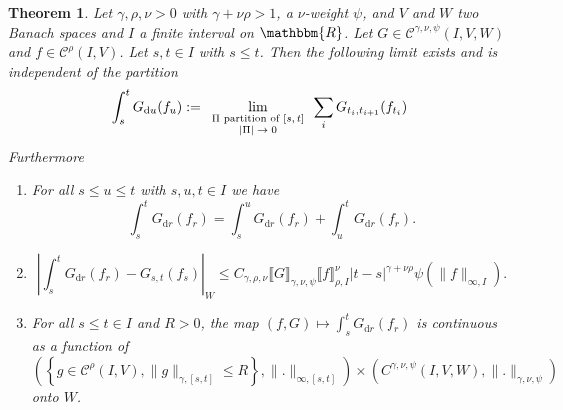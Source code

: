 \documentclass[a4paper,11pt]{article}
\newcommand{\assign}{:=}
\newcommand{\mathd}{\mathrm{d}}
\newcommand{\tmscript}[1]{\text{\scriptsize{$#1$}}}
\newtheorem{theorem}{Theorem}[section]
\newcommand{\CC}{\mathscr C}
\begin{document}
\begin{theorem}
  \label{theorem:young integral}Let $\gamma , \rho , \nu >0$ with $\gamma +
  \nu \rho >1$, a $\nu$-weight $\psi$, and $V$ and $W$ two Banach spaces and
  $I$ a finite interval on $\mathbbm{R}$. Let $G \in \CC^{\gamma , \nu , \psi}
  ( I,V,W )$ and $f \in \CC^{\rho} (I,V)$. Let $s,t \in I$ with $s \leqslant
  t$. Then the following limit exists and is independent of the partition
  \[ \int_{s}^{t} G_{\mathd u} (f_{u} ) \assign
     \lim_{\tmscript{\begin{array}{c}
         \text{$\Pi$ partition of $[s,t]$}\\
       | \Pi | \to 0
     \end{array}}}   \sum_{i} G_{t_{i} ,t_{i+1}} (f_{t_{i}} ) \]
  Furthermore
  \begin{enumerate}
    \item For all $s \leqslant u \leqslant t$ with $s,u,t \in I$ we have
    \[ \int_{s}^{t} G_{\mathd r} (f_{r} ) = \int_{s}^{u} G_{\mathd r} (f_{r} )
       + \int_{u}^{t} G_{\mathd r} (f_{r} ) . \]
    \item
    \[ \left\lvert \int_{s}^{t} G_{\mathd r} (f_{r} )-G_{s,t} (f_{s} ) \right\lvert_{W}
       \leqslant C_{\gamma , \rho , \nu} \llbracket G \rrbracket_{\gamma , \nu
       , \psi} \llbracket f \rrbracket_{\rho ,I}^{\nu}  |t-s|^{\gamma + \nu
       \rho} \psi ( \| f \|_{\infty ,I} ) . \]
    \item For all $s \leqslant t \in I$ and $R>0$, the map $(f,G) \mapsto
    \int_{s}^{t} G_{\mathd r} (f_{r} )$ is continuous as a function of $\left(
    \left\{ g \in \CC^{\rho} (I,V), \| g \|_{\gamma , [ s,t ]} \leqslant R
    \right\} ,\|.\|_{\infty ,[s,t]} \right) \times ( C^{\gamma , \nu , \psi} (
    I,V,W ) ,\|.\|_{\gamma , \nu , \psi} )$ onto $W$.
  \end{enumerate}
\end{theorem}
\end{document}
